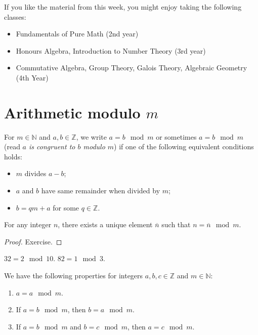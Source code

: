 \documentclass[11pt,dvipsnames]{book}
\numberwithin{figure}{section} %
\numberwithin{table}{section} %
\begin{document}
If you like the material from this week, you might enjoy taking the following classes:

\begin{itemize}
\item Fundamentals of Pure Math (2nd year)
\item Honours Algebra, Introduction to Number Theory (3rd year)
\item Commutative Algebra, Group Theory, Galois Theory, Algebraic Geometry (4th Year)
\end{itemize}

\section{Arithmetic modulo $m$}%
\label{arithmeticmodm}

\begin{definition}
\label{d:mod}
For $m\in \mathbb{N}$ and $a,b\in \mathbb{Z}$, we write $a = b\mod m$ or sometimes $a  = b\mod m$ (read {\it $a$ is congruent to $b$ modulo $m$}) if one of the following equivalent conditions holds:

\begin{itemize}
\item $m$ divides $a-b$;
\item $a$ and $b$ have same remainder when divided by $m$;
\item $b=qm+a$ for some $q\in \mathbb{Z}$.
\end{itemize}
\end{definition}

\begin{proposition}
For any integer $n$, there exists a unique element $\overline{n}$ such that $n = \overline{n} \mod m$.
\end{proposition}
\begin{proof}
Exercise.
\end{proof}

\begin{example}
$32=2\mod 10$. $82=1 \mod 3$.
\end{example}

\begin{theorem}
We have the following properties for integers $a,b,c\in\mathbb{Z}$ and $m\in\mathbb{N}$:
\begin{enumerate}[label=(\alph*)]
\item $a = a\mod m$.
\item If $a = b\mod m$, then $b = a\mod m$.
\item If $a = b\mod m$ and $b = c\mod m$, then $a = c\mod m$.
\end{enumerate}
\end{theorem}
\end{document}

